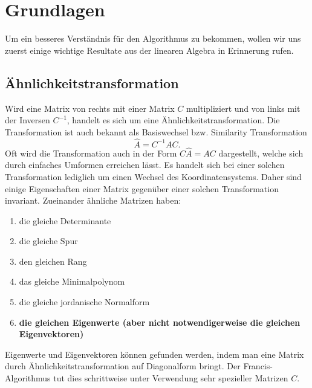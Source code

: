 \section{Grundlagen\label{francis:section:grundlagen}}
Um ein besseres Verständnis für den Algorithmus zu bekommen, wollen wir uns zuerst einige wichtige Resultate aus der linearen Algebra in Erinnerung rufen.

\subsection{Ähnlichkeitstransformation\label{francis:section:grundlagen:aehnlichkeitstransform}}
%
%
Wird eine Matrix von rechts mit einer Matrix $C$ multipliziert und von links mit der Inversen $C^{-1}$, handelt es sich um eine Ähnlichkeitstransformation. Die Transformation ist auch bekannt als Basiswechsel bzw. Similarity Transformation
\begin{equation}
	\hat{A}=C^{-1}AC.
\end{equation}
Oft wird die Transformation auch in der Form $C\hat{A}=AC$ dargestellt, welche sich durch einfaches Umformen erreichen lässt.
Es handelt sich bei einer solchen Transformation lediglich um einen Wechsel des Koordinatensystems.
Daher sind einige Eigenschaften einer Matrix gegenüber einer solchen Transformation invariant.
Zueinander ähnliche Matrizen haben:
\begin{enumerate}
	\item die gleiche Determinante
%
	\item die gleiche Spur
%
	\item den gleichen Rang
%
	\item das gleiche Minimalpolynom
%
	\item die gleiche jordanische Normalform
%
%
	\item \textbf{die gleichen Eigenwerte (aber nicht notwendigerweise die gleichen Eigenvektoren)}
\end{enumerate}

Eigenwerte und Eigenvektoren können gefunden werden, indem man eine Matrix durch Ähnlichkeitstransformation auf Diagonalform bringt.
%
Der Francis-Algorithmus tut dies schrittweise unter Verwendung sehr spezieller Matrizen $C$.


